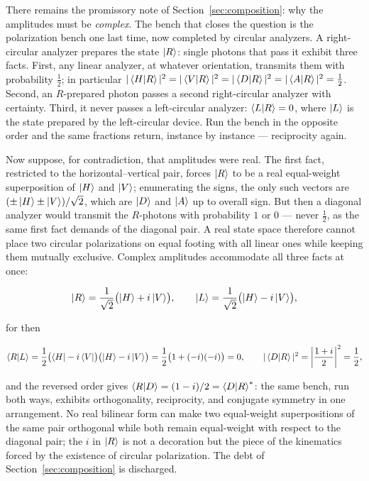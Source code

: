 There remains the promissory note of Section~\ref{sec:composition}: why the amplitudes must be \emph{complex}. The bench that closes the question is the polarization bench one last time, now completed by circular analyzers. A right-circular analyzer prepares the state $\ket{R}$: single photons that pass it exhibit three facts. First, any linear analyzer, at whatever orientation, transmits them with probability $\tfrac12$; in particular $|\braket{H|R}|^2=|\braket{V|R}|^2=|\braket{D|R}|^2=|\braket{A|R}|^2=\tfrac12$. Second, an $R$-prepared photon passes a second right-circular analyzer with certainty. Third, it never passes a left-circular analyzer: $\braket{L|R}=0$, where $\ket{L}$ is the state prepared by the left-circular device. Run the bench in the opposite order and the same fractions return, instance by instance --- reciprocity again.

Now suppose, for contradiction, that amplitudes were real. The first fact, restricted to the horizontal--vertical pair, forces $\ket{R}$ to be a real equal-weight superposition of $\ket{H}$ and $\ket{V}$; enumerating the signs, the only such vectors are $(\pm\ket{H}\pm\ket{V})/\sqrt{2}$, which are $\ket{D}$ and $\ket{A}$ up to overall sign. But then a diagonal analyzer would transmit the $R$-photons with probability $1$ or $0$ --- never $\tfrac12$, as the same first fact demands of the diagonal pair. A real state space therefore cannot place two circular polarizations on equal footing with all linear ones while keeping them mutually exclusive. Complex amplitudes accommodate all three facts at once:
\begin{linenomath}
\begin{equation}
    \ket{R}=\frac{1}{\sqrt{2}}\bigl(\ket{H}+i\ket{V}\bigr),
    \qquad
    \ket{L}=\frac{1}{\sqrt{2}}\bigl(\ket{H}-i\ket{V}\bigr),
\end{equation}
\end{linenomath}
for then
\begin{linenomath}
\begin{equation}
    \braket{R|L}
    =
    \frac{1}{2}\bigl(\bra{H}-i\bra{V}\bigr)\bigl(\ket{H}-i\ket{V}\bigr)
    =
    \frac{1}{2}\bigl(1+(-i)(-i)\bigr)
    =
    0,
    \qquad
    |\braket{D|R}|^2
    =
    \left|\frac{1+i}{2}\right|^2
    =
    \frac{1}{2},
\end{equation}
\end{linenomath}
and the reversed order gives $\braket{R|D}=(1-i)/2=\braket{D|R}^{*}$: the same bench, run both ways, exhibits orthogonality, reciprocity, and conjugate symmetry in one arrangement. No real bilinear form can make two equal-weight superpositions of the same pair orthogonal while both remain equal-weight with respect to the diagonal pair; the $i$ in $\ket{R}$ is not a decoration but the piece of the kinematics forced by the existence of circular polarization. The debt of Section~\ref{sec:composition} is discharged.

